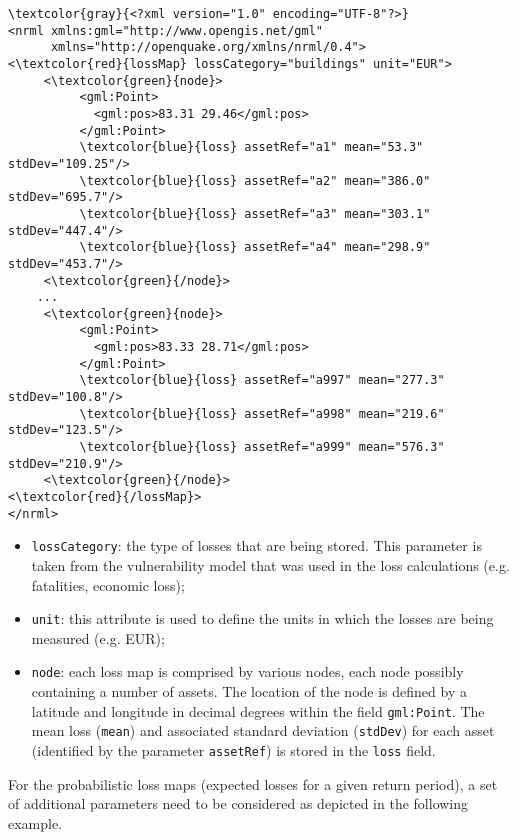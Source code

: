 \begin{Verbatim}[frame=single, commandchars=\\\{\}, samepage=false]
\textcolor{gray}{<?xml version="1.0" encoding="UTF-8"?>}
<nrml xmlns:gml="http://www.opengis.net/gml"
      xmlns="http://openquake.org/xmlns/nrml/0.4">
<\textcolor{red}{lossMap} lossCategory="buildings" unit="EUR">
     <\textcolor{green}{node}>
          <gml:Point>
            <gml:pos>83.31 29.46</gml:pos>
          </gml:Point>
          \textcolor{blue}{loss} assetRef="a1" mean="53.3" stdDev="109.25"/>
          \textcolor{blue}{loss} assetRef="a2" mean="386.0" stdDev="695.7"/>
          \textcolor{blue}{loss} assetRef="a3" mean="303.1" stdDev="447.4"/>
          \textcolor{blue}{loss} assetRef="a4" mean="298.9" stdDev="453.7"/>
     <\textcolor{green}{/node}>
    ...
     <\textcolor{green}{node}>
          <gml:Point>
            <gml:pos>83.33 28.71</gml:pos>
          </gml:Point>
          \textcolor{blue}{loss} assetRef="a997" mean="277.3" stdDev="100.8"/>
          \textcolor{blue}{loss} assetRef="a998" mean="219.6" stdDev="123.5"/>
          \textcolor{blue}{loss} assetRef="a999" mean="576.3" stdDev="210.9"/>
     <\textcolor{green}{/node}>
<\textcolor{red}{/lossMap}>
</nrml>
\end{Verbatim}

\begin{itemize}
\item  \Verb+lossCategory+: the type of losses that are being stored. This parameter is taken from the \gls{vulnerability model} that was used in the loss calculations (e.g. fatalities, economic loss);
\item  \Verb+unit+: this attribute is used to define the units in which the losses are being measured (e.g. EUR);
\item  \Verb+node+: each loss map is comprised by various nodes, each node possibly containing a number of \glspl{asset}. The location of the node is defined by a latitude and longitude in decimal degrees within the field \Verb+gml:Point+. The mean loss (\Verb+mean+) and associated standard deviation (\Verb+stdDev+) for each \gls{asset} (identified by the parameter \Verb+assetRef+) is stored in the \Verb+loss+ field.
\end{itemize}

For the probabilistic loss maps (expected losses for a given return period), a set of additional parameters need to be considered as depicted in the following example.

